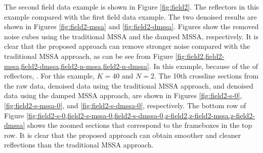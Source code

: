 The second field data example is shown in Figure \ref{fig:field2}. The reflectors in this example  compared with the first field data example. The two denoised results are shown in Figures \ref{fig:field2-mssa} and \ref{fig:field2-dmssa}. Figures  show the removed noise cubes using the traditional MSSA and the damped MSSA, respectively. It is clear that the proposed approach can remove stronger noise compared with the traditional MSSA approach, as can be see from Figure \ref{fig:field2,field2-mssa,field2-dmssa,field2-n-mssa,field2-n-dmssa}. In this example, because of the  of reflectors, .  For this example, $K=40$ and $N=2$. The 10th crossline sections  from the raw data,  denoised data using the traditional MSSA approach, and  denoised data using the damped MSSA approach, are shown in Figures \ref{fig:field2-s-0}, \ref{fig:field2-s-mssa-0}, and \ref{fig:field2-s-dmssa-0}, respectively. The bottom row of Figure \ref{fig:field2-s-0,field2-s-mssa-0,field2-s-dmssa-0,z-field2,z-field2-mssa,z-field2-dmssa} shows the zoomed sections that correspond to the frameboxes in the top row. It is clear that the proposed approach can obtain smoother and cleaner reflections than the traditional MSSA approach. 



